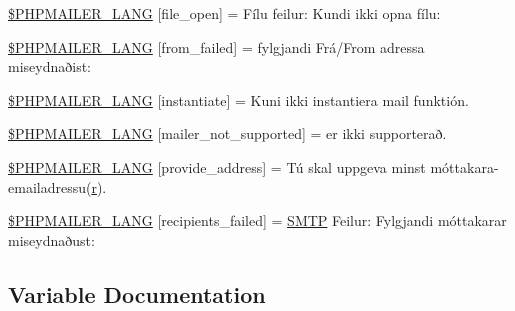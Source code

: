 \begin{DoxyCompactItemize}
\item 
\hyperlink{phpmailer_8lang-fo_8php_a28d1a6517bf4c942a0ddd506188ad2e0}{\$\+P\+H\+P\+M\+A\+I\+L\+E\+R\+\_\+\+L\+A\+NG} \mbox{[}\textquotesingle{}file\+\_\+open\textquotesingle{}\mbox{]} = \textquotesingle{}Fílu feilur\+: Kundi ikki opna fílu\+: \textquotesingle{}
\item 
\hyperlink{phpmailer_8lang-fo_8php_adf832ae12155a09be077c6d5e4fd7e22}{\$\+P\+H\+P\+M\+A\+I\+L\+E\+R\+\_\+\+L\+A\+NG} \mbox{[}\textquotesingle{}from\+\_\+failed\textquotesingle{}\mbox{]} = \textquotesingle{}fylgjandi Frá/From adressa miseydnaðist\+: \textquotesingle{}
\item 
\hyperlink{phpmailer_8lang-fo_8php_ad58dde16780f4770ccf4dd282ea1f5ad}{\$\+P\+H\+P\+M\+A\+I\+L\+E\+R\+\_\+\+L\+A\+NG} \mbox{[}\textquotesingle{}instantiate\textquotesingle{}\mbox{]} = \textquotesingle{}Kuni ikki instantiera mail funktión.\textquotesingle{}
\item 
\hyperlink{phpmailer_8lang-fo_8php_aa2ebcb8833ee83a7ad67401c4bb3a6ad}{\$\+P\+H\+P\+M\+A\+I\+L\+E\+R\+\_\+\+L\+A\+NG} \mbox{[}\textquotesingle{}mailer\+\_\+not\+\_\+supported\textquotesingle{}\mbox{]} = \textquotesingle{} er ikki supporterað.\textquotesingle{}
\item 
\hyperlink{phpmailer_8lang-fo_8php_a8b97897c2406b7392b056f375feeefbb}{\$\+P\+H\+P\+M\+A\+I\+L\+E\+R\+\_\+\+L\+A\+NG} \mbox{[}\textquotesingle{}provide\+\_\+address\textquotesingle{}\mbox{]} = \textquotesingle{}Tú skal uppgeva minst móttakara-\/emailadressu(\hyperlink{jquery-1_811_81_8min_8js_a96f65b399314d93896076ceb474b6b9b}{r}).\textquotesingle{}
\item 
\hyperlink{phpmailer_8lang-fo_8php_a7589d30bb9b368327c2df015f3e6bcba}{\$\+P\+H\+P\+M\+A\+I\+L\+E\+R\+\_\+\+L\+A\+NG} \mbox{[}\textquotesingle{}recipients\+\_\+failed\textquotesingle{}\mbox{]} = \textquotesingle{}\hyperlink{class_s_m_t_p}{S\+M\+TP} Feilur\+: Fylgjandi móttakarar miseydnaðust\+: \textquotesingle{}
\end{DoxyCompactItemize}


\subsection{Variable Documentation}
